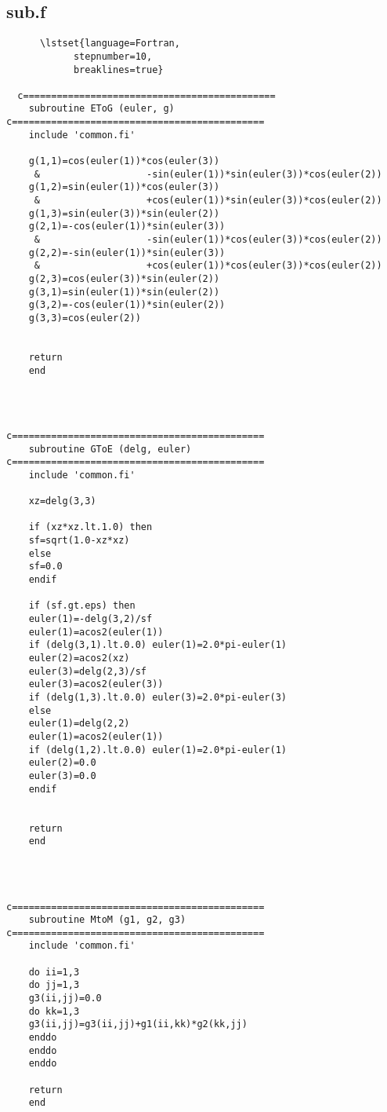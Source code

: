 \subsection{sub.f}



  \begin{lstlisting}
      \lstset{language=Fortran,
    		stepnumber=10,
    		breaklines=true}

  c=============================================
	subroutine EToG (euler, g)
c=============================================
	include 'common.fi'
       
	g(1,1)=cos(euler(1))*cos(euler(3))
     &	                 -sin(euler(1))*sin(euler(3))*cos(euler(2))
	g(1,2)=sin(euler(1))*cos(euler(3))
     &	                 +cos(euler(1))*sin(euler(3))*cos(euler(2))
	g(1,3)=sin(euler(3))*sin(euler(2))
	g(2,1)=-cos(euler(1))*sin(euler(3))
     &	                 -sin(euler(1))*cos(euler(3))*cos(euler(2))
	g(2,2)=-sin(euler(1))*sin(euler(3))
     &	                 +cos(euler(1))*cos(euler(3))*cos(euler(2))
	g(2,3)=cos(euler(3))*sin(euler(2))
	g(3,1)=sin(euler(1))*sin(euler(2))
	g(3,2)=-cos(euler(1))*sin(euler(2))
	g(3,3)=cos(euler(2))


	return
	end




c=============================================
	subroutine GToE (delg, euler)
c=============================================
	include 'common.fi'
	
	xz=delg(3,3)
	
	if (xz*xz.lt.1.0) then
	sf=sqrt(1.0-xz*xz)
	else
	sf=0.0
	endif

	if (sf.gt.eps) then
	euler(1)=-delg(3,2)/sf
	euler(1)=acos2(euler(1))
	if (delg(3,1).lt.0.0) euler(1)=2.0*pi-euler(1)
	euler(2)=acos2(xz)
	euler(3)=delg(2,3)/sf
	euler(3)=acos2(euler(3))
	if (delg(1,3).lt.0.0) euler(3)=2.0*pi-euler(3)
	else
	euler(1)=delg(2,2)
	euler(1)=acos2(euler(1))
	if (delg(1,2).lt.0.0) euler(1)=2.0*pi-euler(1)
	euler(2)=0.0
	euler(3)=0.0
	endif


	return
	end




c=============================================
	subroutine MtoM (g1, g2, g3)
c=============================================
	include 'common.fi'

	do ii=1,3
	do jj=1,3
	g3(ii,jj)=0.0
	do kk=1,3
	g3(ii,jj)=g3(ii,jj)+g1(ii,kk)*g2(kk,jj)
	enddo
	enddo
	enddo

	return
	end





\end{lstlisting}
